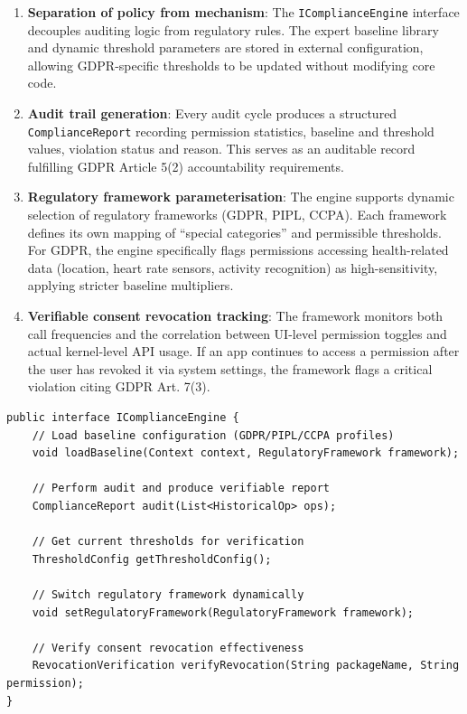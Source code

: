 \begin{enumerate}
\item \textbf{Separation of policy from mechanism}: The \texttt{IComplianceEngine} interface decouples auditing logic from regulatory rules. The expert baseline library and dynamic threshold parameters are stored in external configuration, allowing GDPR-specific thresholds to be updated without modifying core code.
\item \textbf{Audit trail generation}: Every audit cycle produces a structured \texttt{ComplianceReport} recording permission statistics, baseline and threshold values, violation status and reason. This serves as an auditable record fulfilling GDPR Article 5(2) accountability requirements.
\item \textbf{Regulatory framework parameterisation}: The engine supports dynamic selection of regulatory frameworks (GDPR, PIPL, CCPA). Each framework defines its own mapping of ``special categories'' and permissible thresholds. For GDPR, the engine specifically flags permissions accessing health-related data (location, heart rate sensors, activity recognition) as high-sensitivity, applying stricter baseline multipliers.
\item \textbf{Verifiable consent revocation tracking}: The framework monitors both call frequencies and the correlation between UI-level permission toggles and actual kernel-level API usage. If an app continues to access a permission after the user has revoked it via system settings, the framework flags a critical violation citing GDPR Art. 7(3).
\end{enumerate}

\begin{lstlisting}[caption=IComplianceEngine core interface with regulatory audit support]
public interface IComplianceEngine {
    // Load baseline configuration (GDPR/PIPL/CCPA profiles)
    void loadBaseline(Context context, RegulatoryFramework framework);
    
    // Perform audit and produce verifiable report
    ComplianceReport audit(List<HistoricalOp> ops);
    
    // Get current thresholds for verification
    ThresholdConfig getThresholdConfig();
    
    // Switch regulatory framework dynamically
    void setRegulatoryFramework(RegulatoryFramework framework);
    
    // Verify consent revocation effectiveness
    RevocationVerification verifyRevocation(String packageName, String permission);
}
\end{lstlisting}

